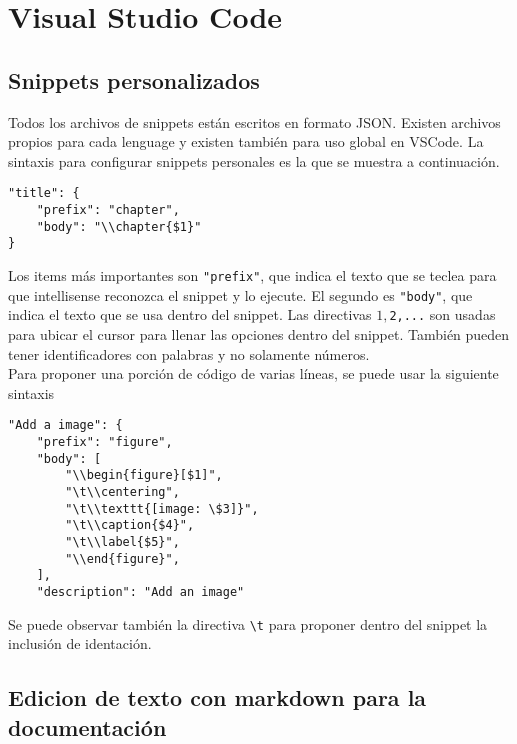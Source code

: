 \chapter{Visual Studio Code}

\section{Snippets personalizados}

Todos los archivos de snippets están escritos en formato JSON. Existen archivos propios para cada lenguage y existen también para uso global en VSCode. La sintaxis para configurar snippets personales es la que se muestra a continuación.

\begin{verbatim}
"title": {
    "prefix": "chapter",
    "body": "\\chapter{$1}"
}
\end{verbatim}

Los items más importantes son \texttt{"prefix"}, que indica el texto que se teclea para que intellisense reconozca el snippet y lo ejecute. El segundo es \texttt{"body"}, que indica el texto que se usa dentro del snippet. Las directivas \texttt{$1,$2,...} son usadas para ubicar el cursor para llenar las opciones dentro del snippet. También pueden tener identificadores con palabras y no solamente números.\\

Para proponer una porción de código de varias líneas, se puede usar la siguiente sintaxis

\begin{verbatim}
"Add a image": {
    "prefix": "figure",
    "body": [
        "\\begin{figure}[$1]",
        "\t\\centering",
        "\t\\texttt{[image: \$3]}",
        "\t\\caption{$4}",
        "\t\\label{$5}",
        "\\end{figure}",
    ],
    "description": "Add an image"
\end{verbatim} 

Se puede observar también la directiva \texttt{\textbackslash t} para proponer dentro del snippet la inclusión de identación.


\section{Edicion de texto con markdown para la documentación}


